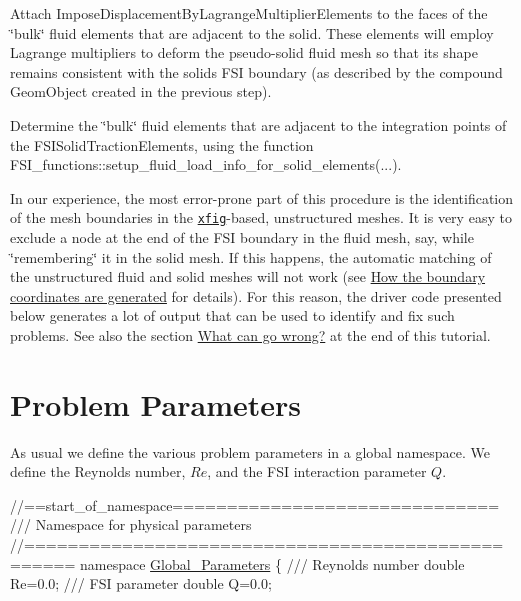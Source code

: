 \begin{DoxyEnumerate}
\item Attach {\ttfamily Impose\+Displacement\+By\+Lagrange\+Multiplier\+Elements} to the faces of the \char`\"{}bulk\char`\"{} fluid elements that are adjacent to the solid. These elements will employ Lagrange multipliers to deform the pseudo-\/solid fluid mesh so that its shape remains consistent with the solid\textquotesingle{}s F\+SI boundary (as described by the compound {\ttfamily Geom\+Object} created in the previous step). ~\newline
~\newline

\item Determine the \char`\"{}bulk\char`\"{} fluid elements that are adjacent to the integration points of the {\ttfamily F\+S\+I\+Solid\+Traction\+Elements}, using the function {\ttfamily F\+S\+I\+\_\+functions\+::setup\+\_\+fluid\+\_\+load\+\_\+info\+\_\+for\+\_\+solid\+\_\+elements}(...). ~\newline
~\newline

\end{DoxyEnumerate}In our experience, the most error-\/prone part of this procedure is the identification of the mesh boundaries in the \href{http://en.wikipedia.org/wiki/Xfig}{\tt xfig}-\/based, unstructured meshes. It is very easy to exclude a node at the end of the F\+SI boundary in the fluid mesh, say, while \char`\"{}remembering\char`\"{} it in the solid mesh. If this happens, the automatic matching of the unstructured fluid and solid meshes will not work (see \hyperlink{index_boundary_coord}{How the boundary coordinates are generated} for details). For this reason, the driver code presented below generates a lot of output that can be used to identify and fix such problems. See also the section \hyperlink{index_go_wrong}{What can go wrong?} at the end of this tutorial.



 

\hypertarget{index_namespace}{}\section{Problem Parameters}\label{index_namespace}
As usual we define the various problem parameters in a global namespace. We define the Reynolds number, $ Re $, and the F\+SI interaction parameter $ Q $.

 
\begin{DoxyCodeInclude}
\textcolor{comment}{//==start\_of\_namespace==============================}
\textcolor{comment}{/// Namespace for physical parameters}
\textcolor{comment}{}\textcolor{comment}{//==================================================}
\textcolor{keyword}{namespace }\hyperlink{namespaceGlobal__Parameters}{Global\_Parameters}
\{\textcolor{comment}{}
\textcolor{comment}{ /// Reynolds number}
\textcolor{comment}{} \textcolor{keywordtype}{double} Re=0.0; 
\textcolor{comment}{}
\textcolor{comment}{ /// FSI parameter}
\textcolor{comment}{} \textcolor{keywordtype}{double} Q=0.0;

\end{DoxyCodeInclude}


